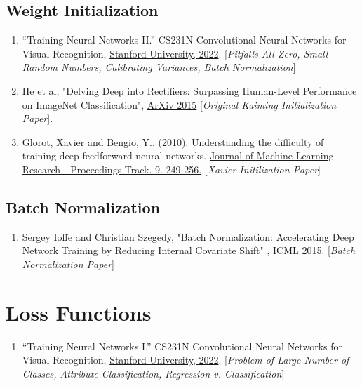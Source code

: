 \documentclass[12pt]{article}
\begin{document}
\subsection{Weight Initialization}
\begin{enumerate}
    \item “Training Neural Networks II.” 
    CS231N Convolutional Neural Networks for Visual Recognition, 
    \href{https://cs231n.github.io/neural-networks-2/#init}{Stanford University, 2022}. 
    [\emph{Pitfalls All Zero, Small Random Numbers, Calibrating Variances, 
    Batch Normalization}]
    \item He et al, "Delving Deep into Rectifiers: Surpassing Human-Level 
    Performance on ImageNet Classification", 
    \href{https://arxiv.org/abs/1502.01852v1}{ArXiv 2015}
    [\emph{Original Kaiming Initialization Paper}]. 
    \item Glorot, Xavier and Bengio, Y.. (2010). 
    Understanding the difficulty of training deep feedforward neural networks. 
    \href{https://www.researchgate.net/publication/215616968_Understanding_the_difficulty_of_training_deep_feedforward_neural_networks}
    {Journal of Machine Learning Research - Proceedings Track. 9. 249-256.}
    [\emph{Xavier Initilization Paper}]

\end{enumerate}

\subsection{Batch Normalization}
\begin{enumerate}
    \item Sergey Ioffe and Christian Szegedy, "Batch Normalization: 
    Accelerating Deep Network Training by Reducing Internal Covariate Shift"
    , \href{https://arxiv.org/abs/1502.03167}{ICML 2015}. 
    [\emph{Batch Normalization Paper}]
\end{enumerate}

\section{Loss Functions}
\begin{enumerate}
    \item “Training Neural Networks I.” 
    CS231N Convolutional Neural Networks for Visual Recognition, 
    \href{https://cs231n.github.io/neural-networks-2/#losses}{Stanford University, 2022}.
    [\emph{Problem of Large Number of Classes, Attribute Classification, 
    Regression v. Classification}]
\end{enumerate}
\end{document}
